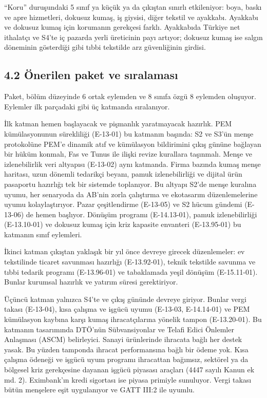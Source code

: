 ``Koru'' duruşundaki 5 sınıf ya küçük ya da çıkıştan sınırlı etkileniyor: boya, baskı ve apre hizmetleri, dokusuz kumaş, iş giysisi, diğer tekstil ve ayakkabı. Ayakkabı ve dokusuz kumaş için korumanın gerekçesi farklı. Ayakkabıda Türkiye net ithalatçı ve S4'te iç pazarda yerli üreticinin payı artıyor; dokusuz kumaş ise salgın döneminin gösterdiği gibi tıbbi tekstilde arz güvenliğinin girdisi.

\hypertarget{nace_kartlar_13-15-42-uxf6nerilen-paket-ve-sux131ralamasux131}{%
\subsection{4.2 Önerilen paket ve sıralaması}\label{nace_kartlar_13-15-42-uxf6nerilen-paket-ve-sux131ralamasux131}}

Paket, bölüm düzeyinde 6 ortak eylemden ve 8 sınıfa özgü 8 eylemden oluşuyor. Eylemler ilk parçadaki gibi üç katmanda sıralanıyor.

İlk katman hemen başlayacak ve pişmanlık yaratmayacak hazırlık. PEM kümülasyonunun sürekliliği (E-13-01) bu katmanın başında: S2 ve S3'ün menşe protokolüne PEM'e dinamik atıf ve kümülasyon bildirimini çıkış gününe bağlayan bir hüküm konmalı, Fas ve Tunus ile ilişki revize kurallara taşınmalı. Menşe ve izlenebilirlik veri altyapısı (E-13-02) aynı katmanda. Firma bazında kumaş menşe haritası, uzun dönemli tedarikçi beyanı, pamuk izlenebilirliği ve dijital ürün pasaportu hazırlığı tek bir sistemde toplanıyor. Bu altyapı S2'de menşe kuralına uyumu, her senaryoda da AB'nin zorla çalıştırma ve ekotasarım düzenlemelerine uyumu kolaylaştırıyor. Pazar çeşitlendirme (E-13-05) ve S2 hücum gündemi (E-13-06) de hemen başlıyor. Dönüşüm programı (E-14.13-01), pamuk izlenebilirliği (E-13.10-01) ve dokusuz kumaş için kriz kapasite envanteri (E-13.95-01) bu katmanın sınıf eylemleri.

İkinci katman çıkıştan yaklaşık bir yıl önce devreye girecek düzenlemeler: ev tekstilinde ticaret savunması hazırlığı (E-13.92-01), teknik tekstilde savunma ve tıbbi tedarik programı (E-13.96-01) ve tabaklamada yeşil dönüşüm (E-15.11-01). Bunlar kurumsal hazırlık ve yatırım süresi gerektiriyor.

Üçüncü katman yalnızca S4'te ve çıkış gününde devreye giriyor. Bunlar vergi takası (E-13-04), kısa çalışma ve işgücü uyumu (E-13-03, E-14.14-01) ve PEM kümülasyon kaybına karşı kumaş ihracatçılarına yönelik tampon (E-13.20-01). Bu katmanın tasarımında DTÖ'nün Sübvansiyonlar ve Telafi Edici Önlemler Anlaşması (ASCM) belirleyici. Sanayi ürünlerinde ihracata bağlı her destek yasak. Bu yüzden tamponda ihracat performansına bağlı bir ödeme yok. Kısa çalışma ödeneği ve işgücü uyum programı ihracattan bağımsız, sektörel ya da bölgesel kriz gerekçesine dayanan işgücü piyasası araçları (4447 sayılı Kanun ek md. 2). Eximbank'ın kredi sigortası ise piyasa primiyle sunuluyor. Vergi takası bütün menşelere eşit uygulanıyor ve GATT III:2 ile uyumlu.

